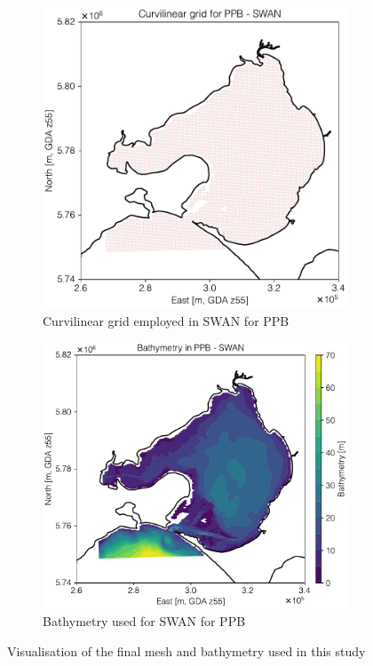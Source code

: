 \documentclass[12pt]{article}
\begin{document}
\begin{figure}[h]
\centering
\begin{subfigure}{.5\textwidth}
  \centering
  \includegraphics[scale=0.55]{plots/maps/grid_SWAN.pdf}
  \caption{Curvilinear grid employed in SWAN for PPB}
  \label{fig:grid_PPB}
\end{subfigure}%
\begin{subfigure}{.5\textwidth}
  \centering
  \includegraphics[scale=0.55]{plots/maps/bathymetry_SWAN.pdf}
  \caption{Bathymetry used for SWAN for PPB}
  \label{fig:bathy_PPB}
\end{subfigure}
\caption{Visualisation of the final mesh and bathymetry used in this study}
\label{fig:grid_bathy_PPB}
\end{figure}
\end{document}
